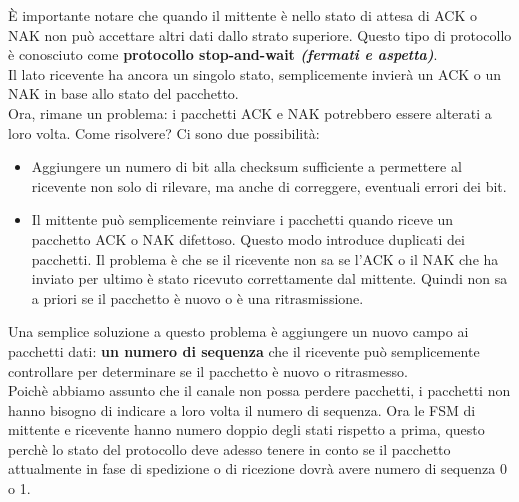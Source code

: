 \documentclass[11pt,a4paper]{article}
\begin{document}
È importante notare che quando il mittente è nello stato di attesa di ACK o NAK non può accettare altri dati dallo strato superiore. Questo tipo di protocollo è conosciuto come \textbf{protocollo stop-and-wait \textit{(fermati e aspetta)}}. \\
Il lato ricevente ha ancora un singolo stato, semplicemente invierà un ACK o un NAK in base allo stato del pacchetto. \\
Ora, rimane un problema: i pacchetti ACK e NAK potrebbero essere alterati a loro volta. Come risolvere? Ci sono due possibilità:
\begin{itemize}
	\item Aggiungere un numero di bit alla checksum sufficiente a permettere al ricevente non solo di rilevare, ma anche di correggere, eventuali errori dei bit.
	\item Il mittente può semplicemente reinviare i pacchetti quando riceve un pacchetto ACK o NAK difettoso. Questo modo introduce duplicati dei pacchetti. Il problema è che se il ricevente non sa se l'ACK o il NAK che ha inviato per ultimo è stato ricevuto correttamente dal mittente. Quindi non sa a priori se il pacchetto è nuovo o è una ritrasmissione.
\end{itemize}
Una semplice soluzione a questo problema è aggiungere un nuovo campo ai pacchetti dati: \textbf{un numero di sequenza} che il ricevente può semplicemente controllare per determinare se il pacchetto è nuovo o ritrasmesso. \\
Poichè abbiamo assunto che il canale non possa perdere pacchetti, i pacchetti non hanno bisogno di indicare a loro volta il numero di sequenza. Ora le FSM di mittente e ricevente hanno numero doppio degli stati rispetto a prima, questo perchè lo stato del protocollo deve adesso tenere in conto se il pacchetto attualmente in fase di spedizione o di ricezione dovrà avere numero di sequenza 0 o 1. \pagebreak
\end{document}
